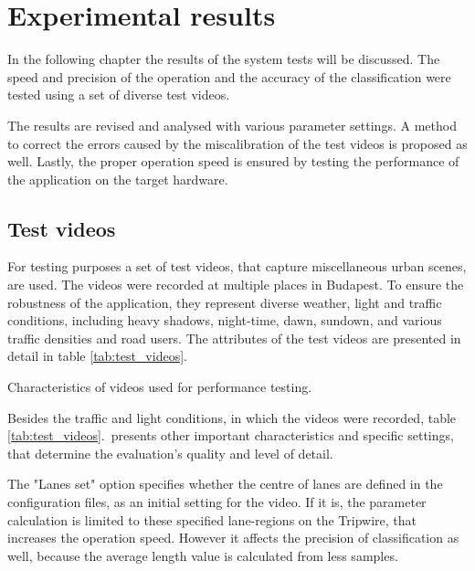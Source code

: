 \chapter{Experimental results}\label{chap:Tests}
In the following chapter the results of the system tests will be discussed. 
The speed and precision of the operation and the accuracy of the classification were tested using a set of diverse test videos.

The results are revised and analysed with various parameter settings.
A method to correct the errors caused by the miscalibration of the test videos is proposed as well.
Lastly, the proper operation speed is ensured by testing the performance of the application on the target hardware.

\section{Test videos}\label{sec:test_videos}
For testing purposes a set of test videos, that capture miscellaneous urban scenes, are used.
The videos were recorded at multiple places in Budapest.
To ensure the robustness of the application, they represent diverse weather, light and traffic conditions, including heavy shadows, night-time, dawn, sundown, and various traffic densities and road users.
The attributes of the test videos are presented in detail in table \ref{tab:test_videos}.

\begin{table}[!h]
	\begin{adjustbox}{center}
	\end{adjustbox}
	\caption{Characteristics of videos used for performance testing.}
	\label{tab:test_videos}
\end{table}

Besides the traffic and light conditions, in which the videos were recorded, table \ref{tab:test_videos}.~presents other important characteristics and specific settings, that determine the evaluation's quality and level of detail.

The "Lanes set" option specifies whether the centre of lanes are defined in the configuration files, as an initial setting for the video.
If it is, the parameter calculation is limited to these specified lane-regions on the Tripwire, that increases the operation speed.
However it affects the precision of classification as well, because the average length value is calculated from less samples.

